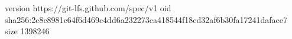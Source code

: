 version https://git-lfs.github.com/spec/v1
oid sha256:2c8c8981c64f6d469c4dd6a232273ca418544f18cd32af6b30fa17241daface7
size 1398246
